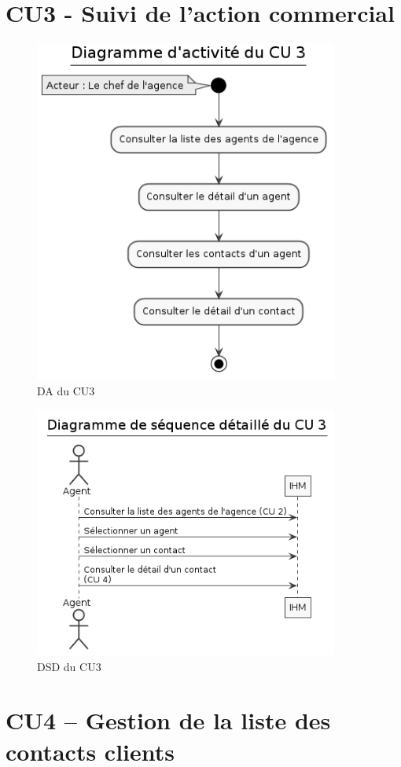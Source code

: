 \clearpage
\section{CU3 - Suivi de l’action commercial}

\begin{figure}[H]
\centering
\includegraphics[width=10cm]{figures/DA_CU3.png}
\caption{DA du CU3}
\end{figure}

\begin{figure}[H]
\centering
\includegraphics[width=10cm]{figures/DSD_CU3.png}
\caption{DSD du CU3}
\end{figure}

\clearpage
\section{CU4 – Gestion de la liste des contacts clients}

